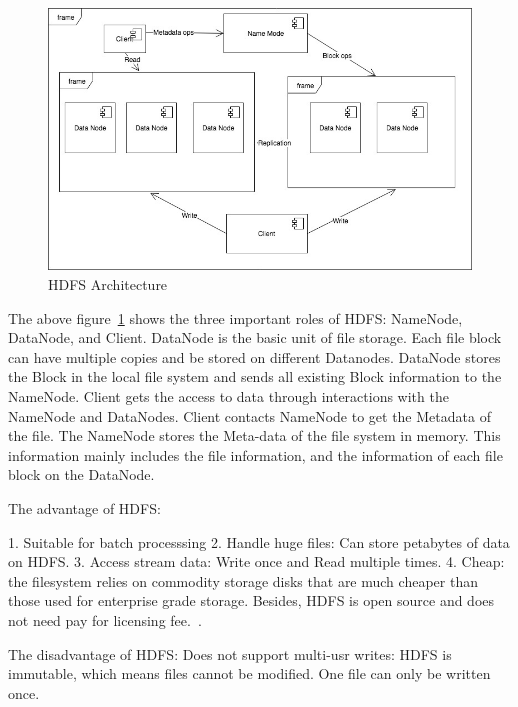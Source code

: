 \begin{figure}[!ht]
  \centering\includegraphics[width=\columnwidth]{images/HDFS.jpg}
  \caption{HDFS Architecture}\label{f:hdfs}
\end{figure}


The above figure~\ref{f:hdfs} shows the three important roles of HDFS: NameNode, DataNode, and Client. DataNode is the basic unit of file storage. Each file block can have multiple copies and be stored on different Datanodes. DataNode stores the Block in the local file system and sends all existing Block information to the NameNode. Client gets the access to data through interactions with the NameNode and DataNodes. Client contacts NameNode to get the Metadata of the file. The NameNode stores the Meta-data of the file system in memory. This information mainly includes the file information, and the information of each file block on the DataNode. 

The advantage of HDFS:

1. Suitable for batch processsing
2. Handle huge files: Can store petabytes of data on HDFS.
3. Access stream data: Write once and Read multiple times.
4. Cheap: the filesystem relies on commodity storage disks that are much cheaper than those used for enterprise grade storage. Besides, HDFS is open source and does not need pay for licensing fee.~\cite{hid-sp18-508-hdfs}.

The disadvantage of HDFS:
 Does not support multi-usr writes: HDFS is immutable, which means files cannot be modified. One file can only be written once. 

